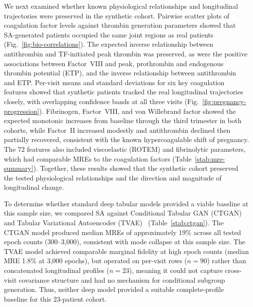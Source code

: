 We next examined whether known physiological relationships and longitudinal
trajectories were preserved in the synthetic cohort. Pairwise scatter plots of
coagulation factor levels against thrombin generation parameters showed that
SA-generated patients occupied the same joint regions as real patients
(Fig.~\ref{fig:bio-correlations}). The expected inverse relationship between
antithrombin and TF-initiated peak thrombin was preserved, as were the positive
associations between Factor~VIII and peak, prothrombin and endogenous thrombin
potential (ETP), and the inverse relationship between antithrombin and ETP.
Per-visit means and standard deviations for six key coagulation features showed
that synthetic patients tracked the real longitudinal trajectories closely, with
overlapping confidence bands at all three visits
(Fig.~\ref{fig:pregnancy-progression}). Fibrinogen, Factor~VIII, and von Willebrand
factor showed the expected monotonic increases from baseline through the third
trimester in both cohorts, while Factor~II increased modestly and antithrombin
declined then partially recovered, consistent with the known hypercoagulable shift
of pregnancy. The 72 features also included viscoelastic (ROTEM) and fibrinolytic
parameters, which had comparable MREs to the coagulation factors
(Table~\ref{stab:mre-summary}).  Together, these results
showed that the synthetic cohort preserved the tested physiological relationships and
the direction and magnitude of longitudinal change.

To determine whether standard deep tabular models provided a viable baseline at this sample
size, we compared SA against Conditional Tabular GAN (CTGAN) and Tabular Variational Autoencoder
(TVAE)~\citep{Xu2019CTGAN} (Table~\ref{stab:ctgan}). The CTGAN model produced median
MREs of approximately 19\% across all tested epoch counts (300--3,000), consistent with
mode collapse at this sample size. The TVAE model achieved comparable marginal fidelity at
high epoch counts (median MRE
1.8\% at 3,000 epochs), but operated on per-visit rows ($n{=}90$) rather than
concatenated longitudinal profiles ($n{=}23$), meaning it could not capture cross-visit
covariance structure and had no mechanism for conditional subgroup generation. Thus, neither
deep model provided a suitable complete-profile baseline for this $23$-patient cohort.

